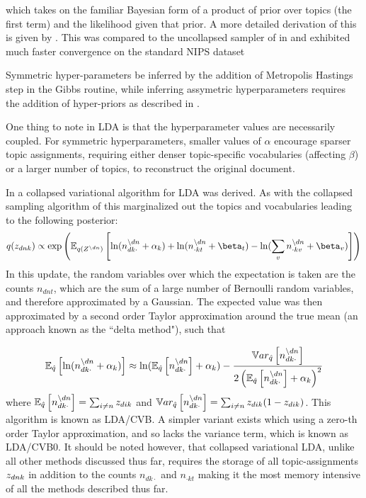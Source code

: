 which takes on the familiar Bayesian form of a product of prior over topics (the first term) and the likelihood given that prior. A more detailed derivation of this is given by \cite{Heinrich2005}. This was compared to the uncollapsed sampler of \cite{Pritchard2000} in and exhibited much faster convergence on the standard NIPS dataset

Symmetric hyper-parameters be inferred by the addition of Metropolis Hastings step in the Gibbs routine, while inferring assymetric hyperparameters requires the addition of hyper-priors as described in \cite{Wallach2009a}. 

One thing to note in LDA is that the hyperparameter values are necessarily coupled. For symmetric hyperparameters, smaller values of $\alpha$ encourage sparser topic assignments, requiring either denser topic-specific vocabularies (affecting $\beta$) or a larger number of topics, to reconstruct the original document.

In \cite{Teh2007} a collapsed variational algorithm for LDA was derived. As with the collapsed sampling algorithm of \cite{Griffiths2004} this marginalized out the topics and vocabularies leading to the following posterior:
\begin{equation}
q(\zdnk) \propto \exp\left(\ex{
    \ln (n_{dk\cdot}^{\setminus dn} + \alpha_k ) 
    + \ln (n_{\cdot kt}^{\setminus dn} + \beta_t)
    - \ln (\sum_v n_{\cdot kv}^{\setminus dn} + \beta_v)}{q(Z^{\setminus dn})}
\right)
\end{equation}
In this update, the random variables over which the expectation is taken are the counts $n_{dnt}$, which are the sum of a large number of Bernoulli random variables, and therefore approximated by a Gaussian. The expected value was then approximated by a second order Taylor approximation around the true mean (an approach known as the ``delta method"\cite{Wang2013}), such that

\begin{align}
\ex{\ln (n_{dk\cdot}^{\setminus dn} + \alpha_k )}{\hat{q}} 
\approx 
\ln (\ex{n_{dk\cdot}^{\setminus dn}}{\hat{q}} + \alpha_k ) - \frac{\var{n_{dk\cdot}^{\setminus dn}}{\hat{q}}}{2\left( \ex{n_{dk\cdot}^{\setminus dn}}{\hat{q}} + \alpha_k \right)^2}
\end{align}
where $\ex{n_{dk\cdot}^{\setminus dn}}{\hat{q}} = \sum_{i \neq n} z_{dik}$ and $\var{n_{dk\cdot}^{\setminus dn}}{\hat{q}} = \sum_{i \neq n} z_{dik}(1 - z_{dik})$. This algorithm is known as LDA/CVB. A simpler variant exists which using a zero-th order Taylor approximation, and so lacks the variance term, which is known as LDA/CVB0. It should be noted however, that collapsed variational LDA, unlike all other methods discussed thus far, requires the storage of all topic-assignments $\zdnk$ in addition to the counts $n_{dk\cdot}$ and $n_{\cdot kt}$ making it the most memory intensive of all the methods described thus far.

